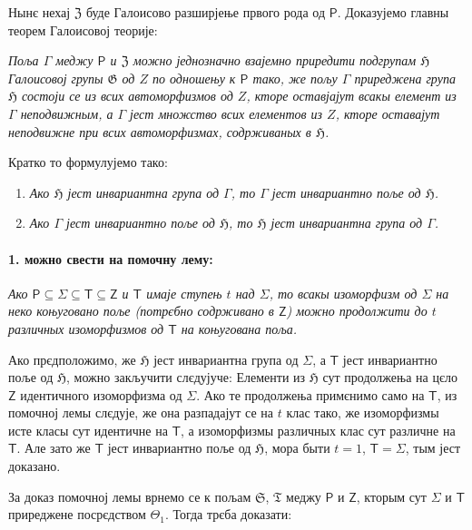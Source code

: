 \documentclass[11pt]{article}
\begin{document}
Нынє нехај \(\mathfrak Z\) буде Галоисово разширјење првого рода од \(\mathsf P\). Доказујемо главны теорем Галоисовој теорије:

\emph{Поља \(\Gamma\) меджу \(\mathsf P\) и \(\mathfrak Z\) можно једнозначно взајемно приредити подгрупам \(\mathfrak H\) Галоисовој групы \(\mathfrak G\) од \(Z\) по одношењу к \(\mathsf P\) тако, же пољу \(\Gamma\) приреджена група \(\mathfrak H\) состоји се из всих автоморфизмов од \(Z\), кторе оставјајут всакы елемент из \(\Gamma\) неподвижным, а \(\Gamma\) јест множство всих елементов из \(Z\), кторе оставајут неподвижне при всих автоморфизмах, содрживаных в \(\mathfrak H\).}

Кратко то формулујемо тако:

\begin{enumerate}
\item \emph{Ако \(\mathfrak H\) јест инвариантна група од \(\Gamma\), то \(\Gamma\) јест инвариантно поље од \(\mathfrak H\).}
\item \emph{Ако \(\Gamma\) јест инвариантно поље од \(\mathfrak H\), то \(\mathfrak H\) јест инвариантна група од \(\Gamma\).}
\end{enumerate}

\paragraph{1. можно свести на помочну лему:}\label{laesst-sich-zurueckfuehren-auf-den-hilfssatz}

\emph{Ако \(\mathsf P \subseteq \Sigma \subseteq \mathsf T \subseteq \mathsf Z\) и \(\mathsf T\) имаје ступењ \(t\) над \(\Sigma\), то всакы изоморфизм од \(\Sigma\) на неко коњуговано поље (потрєбно содрживано в \(\mathsf Z\)) можно продолжити до \(t\) различных изоморфизмов од \(\mathsf T\) на коњугована поља.}

Ако прєдположимо, же \(\mathfrak H\) јест инвариантна група од \(\Sigma\), а \(\mathsf T\) јест инвариантно поље од \(\mathfrak H\), можно закључити слєдујуче: Елементи из \(\mathfrak H\) сут продолжења на цєло \(\mathsf Z\) идентичного изоморфизма од \(\Sigma\). Ако те продолжења примєнимо само на \(\mathsf T\), из помочној лемы слєдује, же она разпадајут се на \(t\) клас тако, же изоморфизмы исте класы сут идентичне на \(\mathsf T\), а изоморфизмы различных клас сут различне на \(\mathsf T\). Але зато же \(\mathsf T\) јест инвариантно поље од \(\mathfrak H\), мора быти \(t=1\), \(\mathsf T=\Sigma\), тым јест доказано.

За доказ помочној лемы врнемо се к пољам \(\mathfrak S\), \(\mathfrak T\) меджу \(\mathsf P\) и \(\mathsf Z\), кторым сут \(\Sigma\) и \(\mathsf T\) приреджене посрєдством \(\Theta_1\). Тогда трєба доказати:
\end{document}

